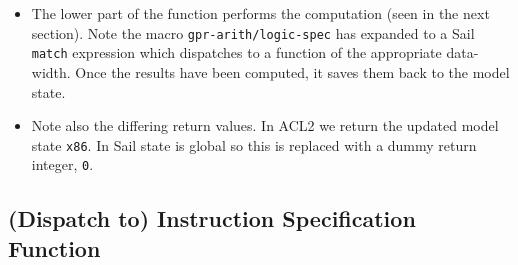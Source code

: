 \documentclass[a4paper]{article}
\begin{document}
\begin{tcolorbox}[breakable]
\begin{itemize}
  \item The lower part of the function performs the computation (seen in the next section).  Note the macro \texttt{gpr-arith/logic-spec} has expanded to a Sail \texttt{match} expression which dispatches to a function of the appropriate data-width.  Once the results have been computed, it saves them back to the model state.

  \item Note also the differing return values.  In ACL2 we return the updated model state \texttt{x86}.  In Sail state is global so this is replaced with a dummy return integer, \texttt{0}.
\end{itemize}
\end{tcolorbox}


\subsection{(Dispatch to) Instruction Specification Function}
\end{document}
